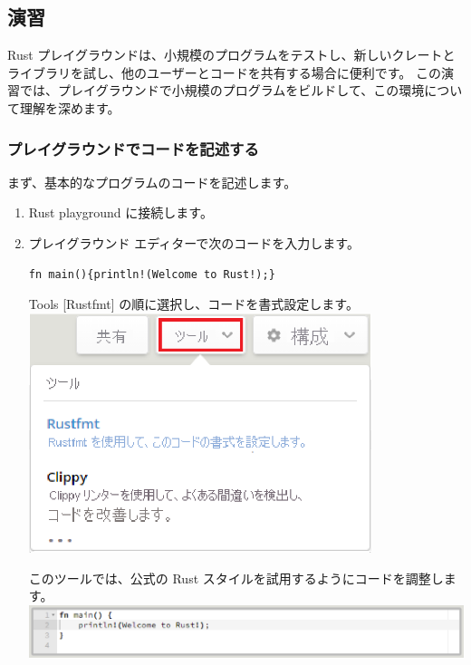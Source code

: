 \subsection{演習}

Rust プレイグラウンドは、小規模のプログラムをテストし、新しいクレートとライブラリを試し、他のユーザーとコードを共有する場合に便利です。 この演習では、プレイグラウンドで小規模のプログラムをビルドして、この環境について理解を深めます。

\subsubsection{プレイグラウンドでコードを記述する}

まず、基本的なプログラムのコードを記述します。

\begin{enumerate}
\item Rust playground に接続します。

\item プレイグラウンド エディターで次のコードを入力します。

\begin{lstlisting}[numbers=none]
fn main(){println!(Welcome to Rust!);}
\end{lstlisting}

\item [Tools][Rustfmt] の順に選択し、コードを書式設定します。
\includegraphics[width=10cm]{rust-playground-tools.eps}

このツールでは、公式の Rust スタイルを試用するようにコードを調整します。
\includegraphics[width=14cm]{rust-playground-rustfmt.eps}


\end{enumerate}
